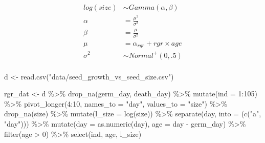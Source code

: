 \documentclass[
  letterpaper,
  DIV=11,
  numbers=noendperiod]{scrartcl}
\newenvironment{Shaded}{\begin{snugshade}}{\end{snugshade}}
\newcommand{\AttributeTok}[1]{\textcolor[rgb]{0.40,0.45,0.13}{#1}}
\newcommand{\DecValTok}[1]{\textcolor[rgb]{0.68,0.00,0.00}{#1}}
\newcommand{\FunctionTok}[1]{\textcolor[rgb]{0.28,0.35,0.67}{#1}}
\newcommand{\NormalTok}[1]{\textcolor[rgb]{0.00,0.23,0.31}{#1}}
\newcommand{\OtherTok}[1]{\textcolor[rgb]{0.00,0.23,0.31}{#1}}
\newcommand{\SpecialCharTok}[1]{\textcolor[rgb]{0.37,0.37,0.37}{#1}}
\newcommand{\StringTok}[1]{\textcolor[rgb]{0.13,0.47,0.30}{#1}}
\begin{document}
\[
\begin{align*}
log(size) &\sim Gamma(\alpha, \beta)\\
\alpha &= \frac{\mu^2}{\sigma^2}\\
\beta &= \frac{\mu}{\sigma^2} \\
\mu &= \alpha_{rgr} + rgr\times age\\
\sigma^2 &\sim Normal^+(0, .5)\\
\end{align*}
\]

\begin{Shaded}
\begin{Highlighting}[]
\NormalTok{d }\OtherTok{\textless{}{-}} \FunctionTok{read.csv}\NormalTok{(}\StringTok{"data/seed\_growth\_vs\_seed\_size.csv"}\NormalTok{)}


\NormalTok{rgr\_dat }\OtherTok{\textless{}{-}}\NormalTok{ d }\SpecialCharTok{\%\textgreater{}\%} 
  \FunctionTok{drop\_na}\NormalTok{(germ\_day, death\_day) }\SpecialCharTok{\%\textgreater{}\%} 
  \FunctionTok{mutate}\NormalTok{(}\AttributeTok{ind =} \DecValTok{1}\SpecialCharTok{:}\DecValTok{105}\NormalTok{) }\SpecialCharTok{\%\textgreater{}\%} 
  \FunctionTok{pivot\_longer}\NormalTok{(}\DecValTok{4}\SpecialCharTok{:}\DecValTok{10}\NormalTok{, }\AttributeTok{names\_to =} \StringTok{"day"}\NormalTok{, }\AttributeTok{values\_to =} \StringTok{"size"}\NormalTok{) }\SpecialCharTok{\%\textgreater{}\%} 
  \FunctionTok{drop\_na}\NormalTok{(size) }\SpecialCharTok{\%\textgreater{}\%} 
  \FunctionTok{mutate}\NormalTok{(}\AttributeTok{l\_size =} \FunctionTok{log}\NormalTok{(size)) }\SpecialCharTok{\%\textgreater{}\%} 
  \FunctionTok{separate}\NormalTok{(day, }\AttributeTok{into =}\NormalTok{ (}\FunctionTok{c}\NormalTok{(}\StringTok{"a"}\NormalTok{, }\StringTok{"day"}\NormalTok{))) }\SpecialCharTok{\%\textgreater{}\%} 
  \FunctionTok{mutate}\NormalTok{(}\AttributeTok{day =} \FunctionTok{as.numeric}\NormalTok{(day),}
         \AttributeTok{age =}\NormalTok{ day }\SpecialCharTok{{-}}\NormalTok{ germ\_day) }\SpecialCharTok{\%\textgreater{}\%} 
  \FunctionTok{filter}\NormalTok{(age }\SpecialCharTok{\textgreater{}} \DecValTok{0}\NormalTok{) }\SpecialCharTok{\%\textgreater{}\%} 
  \FunctionTok{select}\NormalTok{(ind, age, l\_size)}


\end{Highlighting}
\end{Shaded}
\end{document}
